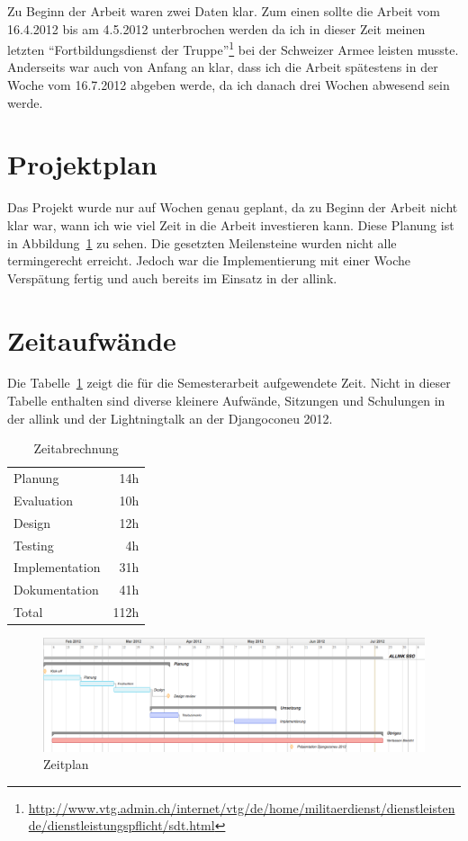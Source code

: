 Zu Beginn der Arbeit waren zwei Daten klar. Zum einen sollte die Arbeit vom 16.4.2012 bis am 4.5.2012 unterbrochen werden da ich in dieser Zeit meinen letzten ``Fortbildungsdienst der Truppe''\footnote{\url{http://www.vtg.admin.ch/internet/vtg/de/home/militaerdienst/dienstleistende/dienstleistungspflicht/sdt.html}} bei der Schweizer Armee leisten musste. Anderseits war auch von Anfang an klar, dass ich die Arbeit spätestens in der Woche vom 16.7.2012 abgeben werde, da ich danach drei Wochen abwesend sein werde.

\section{Projektplan}
\label{sec:projektplan}
Das Projekt wurde nur auf Wochen genau geplant, da zu Beginn der Arbeit nicht klar war, wann ich wie viel Zeit in die Arbeit investieren kann. Diese Planung ist in Abbildung~\ref{fig:zeitplan} zu sehen. Die gesetzten Meilensteine wurden nicht alle termingerecht erreicht. Jedoch war die Implementierung mit einer Woche Verspätung fertig und auch bereits im Einsatz in der allink.

\section{Zeitaufwände}
\label{sec:zeitaufwände}
Die Tabelle~\ref{tab:zeitabrechnung} zeigt die für die Semesterarbeit aufgewendete Zeit. Nicht in dieser Tabelle enthalten sind diverse kleinere Aufwände, Sitzungen und Schulungen in der allink und der Lightningtalk an der Djangoconeu 2012.
\begin{table}[ht]
  \centering
  \begin{tabular}{lr}
    Planung & 14h \\
    Evaluation & 10h \\
    Design & 12h \\
    Testing & 4h \\
    Implementation & 31h \\
    Dokumentation & 41h \\
    \hline
    Total & 112h \\
  \end{tabular}
  \caption{Zeitabrechnung}
  \label{tab:zeitabrechnung}
\end{table}

\begin{figure}
  \centering
	\includegraphics[width=21cm, angle=90]{include/zeitplan.png}
	\caption{Zeitplan}
	\label{fig:zeitplan}
\end{figure}
